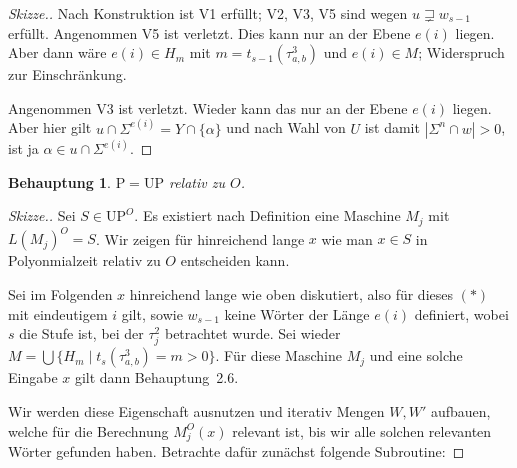 \documentclass[nofonts]{uebung}
\newtheorem{claim}[theorem]{Behauptung}
\theoremstyle{definition}
\def\P{\ensuremath{\mathrm{P}}}
\def\UP{\ensuremath{\mathrm{UP}}}
\begin{document}
\begin{proof}[Skizze.]
    Nach Konstruktion ist V1 erfüllt; V2, V3, V5 sind wegen $u\sqsupsetneq w_{s-1}$ erfüllt. Angenommen V5 ist verletzt. Dies kann nur an der Ebene $e(i)$ liegen. Aber dann wäre $e(i)\in H_{m}$ mit $m=t_{s-1}(\tau^3_{a,b})$ und $e(i)\in M$; Widerspruch zur Einschränkung.

    Angenommen V3 ist verletzt.
    Wieder kann das nur an der Ebene $e(i)$ liegen.
    Aber hier gilt $u\cap\Sigma^{e(i)}=Y\cap\{\alpha\}$ und nach Wahl von $U$ ist damit $|\Sigma^{n}\cap w|>0$, ist ja $\alpha\in u\cap\Sigma^{e(i)}$.
\end{proof}

\begin{claim}
    $\P=\UP$ relativ zu $O$.
\end{claim}
\begin{proof}[Skizze.]
    Sei $S\in \UP^O$. Es existiert nach Definition eine Maschine $M_j$ mit $L(M_j)^O=S$.
    Wir zeigen für hinreichend lange $x$ wie man $x\in S$ in Polyonmialzeit relativ zu $O$ entscheiden kann.
    
    Sei im Folgenden $x$ hinreichend lange wie oben diskutiert, also für dieses $(\ast)$ mit eindeutigem $i$ gilt, sowie $w_{s-1}$ keine Wörter der Länge $e(i)$ definiert, wobei $s$ die Stufe ist, bei der $\tau^2_j$ betrachtet wurde.
    Sei wieder $M=\bigcup \{ H_m \mid t_s(\tau^3_{a,b})=m>0 \}$.
    Für diese Maschine $M_j$ und eine solche Eingabe $x$ gilt dann Behauptung~2.6.

    Wir werden diese Eigenschaft ausnutzen und iterativ Mengen $W, W'$ aufbauen, welche für die Berechnung $M_j^O(x)$ relevant ist, bis wir alle solchen relevanten Wörter gefunden haben.
    Betrachte dafür zunächst folgende Subroutine:


\end{proof}
\end{document}
